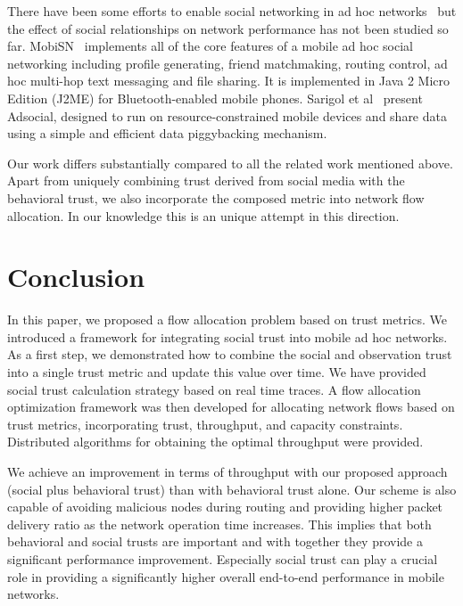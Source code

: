 \documentclass[conference]{IEEEtran}
\begin{document}
There have been some efforts to enable social networking in ad hoc networks~\cite{li09mobisn,sarigl09} but the effect of social relationships on network performance has not been studied so far. MobiSN~\cite{li09mobisn} implements all of the core features of a mobile ad hoc social networking including profile generating, friend matchmaking, routing control, ad hoc multi-hop text messaging and file sharing. It is implemented in Java 2 Micro Edition (J2ME) for Bluetooth-enabled mobile phones. Sarigol et al~\cite{sarigl09}
 present Adsocial, designed to run on resource-constrained mobile devices and share data using a simple and efficient data piggybacking mechanism. 

Our work  differs substantially compared to all the related work mentioned above. Apart from uniquely combining trust derived from social media with the behavioral trust, we also incorporate the composed metric into network flow allocation. In our knowledge this is an unique attempt in this direction.



\section{Conclusion}
\label{sec:conclusion}
In this paper, we proposed a flow allocation problem based on trust metrics. We introduced a framework for integrating social trust into mobile ad hoc networks. As a first step, we demonstrated how to combine the social and observation trust into a single trust metric and update this value over time. We have provided social trust calculation strategy based on real time traces.  A flow allocation optimization framework was then developed for allocating network flows based on trust metrics, incorporating trust, throughput, and capacity constraints.  Distributed algorithms for obtaining the optimal throughput were provided.

 We achieve an improvement in terms of throughput with our proposed approach (social plus behavioral trust) than with behavioral trust alone. Our scheme is also capable of avoiding malicious nodes during routing and providing higher packet delivery ratio as the network operation time increases.  This implies that both behavioral and social trusts are important and with together they provide a significant performance improvement. Especially social trust can play a crucial role in providing a significantly higher overall end-to-end performance in mobile networks.







\end{document}
